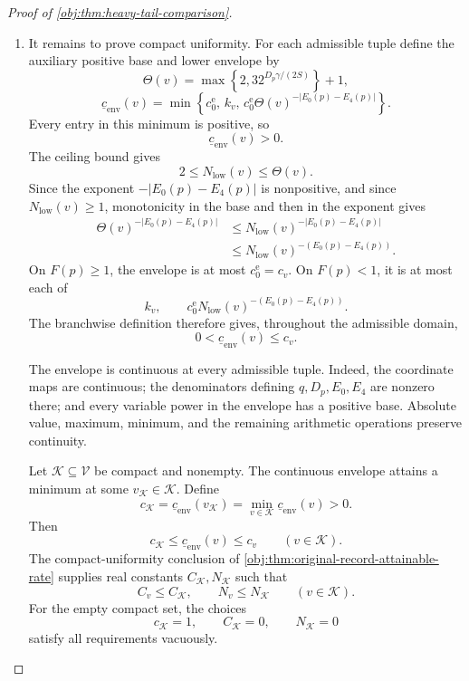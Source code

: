 \documentclass[11pt]{article}
\begin{document}
\begin{proof}[Proof of \cref{obj:thm:heavy-tail-comparison}]
\begin{enumerate}
\item It remains to prove compact uniformity. For each admissible tuple define the auxiliary positive base and lower envelope by
\[
\Theta(v)
=\max\left\{2,32^{D_p\gamma/(2S)}\right\}+1,
\]
\[
\underline c_{\mathrm{env}}(v)
=\min\left\{
c_0^{\mathrm e},\,
k_v,\,
c_0^{\mathrm e}\Theta(v)^{-|E_0(p)-E_4(p)|}
\right\}.
\]
Every entry in this minimum is positive, so
\[
\underline c_{\mathrm{env}}(v)>0.
\]
The ceiling bound gives
\[
2\le N_{\mathrm{low}}(v)\le\Theta(v).
\]
Since the exponent \(-|E_0(p)-E_4(p)|\) is nonpositive, and since
\(N_{\mathrm{low}}(v)\ge1\), monotonicity in the base and then in the exponent gives
\[
\begin{aligned}
\Theta(v)^{-|E_0(p)-E_4(p)|}
&\le N_{\mathrm{low}}(v)^{-|E_0(p)-E_4(p)|}\\
&\le N_{\mathrm{low}}(v)^{-(E_0(p)-E_4(p))}.
\end{aligned}
\]
On \(F(p)\ge1\), the envelope is at most
\(c_0^{\mathrm e}=c_v\). On \(F(p)<1\), it is at most each of
\[
k_v,
\qquad
c_0^{\mathrm e}
N_{\mathrm{low}}(v)^{-(E_0(p)-E_4(p))}.
\]
The branchwise definition therefore gives, throughout the admissible domain,
\[
0<\underline c_{\mathrm{env}}(v)\le c_v.
\]

The envelope is continuous at every admissible tuple. Indeed, the coordinate maps are continuous; the denominators defining \(q,D_p,E_0,E_4\) are nonzero there; and every variable power in the envelope has a positive base. Absolute value, maximum, minimum, and the remaining arithmetic operations preserve continuity.

Let \(\mathcal K\subseteq\mathcal V\) be compact and nonempty. The continuous envelope attains a minimum at some \(v_{\mathcal K}\in\mathcal K\). Define
\[
c_{\mathcal K}
=\underline c_{\mathrm{env}}(v_{\mathcal K})
=\min_{v\in\mathcal K}\underline c_{\mathrm{env}}(v)>0.
\]
Then
\[
c_{\mathcal K}
\le\underline c_{\mathrm{env}}(v)
\le c_v
\qquad(v\in\mathcal K).
\]
The compact-uniformity conclusion of \cref{obj:thm:original-record-attainable-rate} supplies real constants \(C_{\mathcal K},N_{\mathcal K}\) such that
\[
C_v\le C_{\mathcal K},
\qquad
N_v\le N_{\mathcal K}
\qquad(v\in\mathcal K).
\]
For the empty compact set, the choices
\[
c_{\mathcal K}=1,\qquad C_{\mathcal K}=0,\qquad N_{\mathcal K}=0
\]
satisfy all requirements vacuously.


\end{enumerate}
\end{proof}
\end{document}
